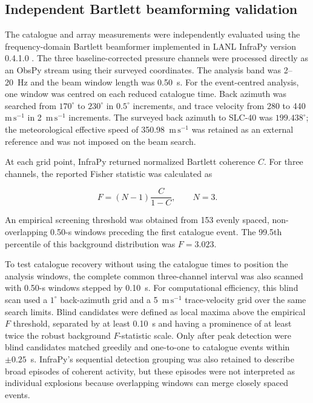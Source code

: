 \subsection{Independent Bartlett beamforming validation}
\label{sec:methods_infrapy_validation}

The catalogue and array measurements were independently evaluated using the
frequency-domain Bartlett beamformer implemented in LANL InfraPy version
0.4.1.0 \citep{infrapy}.  The three baseline-corrected pressure channels were
processed directly as an ObsPy stream using their surveyed coordinates.  The
analysis band was 2--20~Hz and the beam window length was 0.50~s.  For the
event-centred analysis, one window was centred on each reduced catalogue time.
Back azimuth was searched from \(170^{\circ}\) to \(230^{\circ}\) in
\(0.5^{\circ}\) increments, and trace velocity from 280 to
440~\(\mathrm{m\,s^{-1}}\) in 2~\(\mathrm{m\,s^{-1}}\) increments.  The
surveyed back azimuth to SLC-40 was \(199.438^{\circ}\); the meteorological
effective speed of 350.98~\(\mathrm{m\,s^{-1}}\) was retained as an external
reference and was not imposed on the beam search.

At each grid point, InfraPy returned normalized Bartlett coherence \(C\).  For
three channels, the reported Fisher statistic was calculated as

\begin{equation}
F = (N-1)\frac{C}{1-C}, \qquad N=3.
\label{eq:bartlett_f_statistic}
\end{equation}

An empirical screening threshold was obtained from 153 evenly spaced,
non-overlapping 0.50-s windows preceding the first catalogue event.  The
99.5th percentile of this background distribution was \(F=3.023\).

To test catalogue recovery without using the catalogue times to position the
analysis windows, the complete common three-channel interval was also scanned
with 0.50-s windows stepped by 0.10~s.  For computational efficiency, this
blind scan used a \(1^{\circ}\) back-azimuth grid and a
5~\(\mathrm{m\,s^{-1}}\) trace-velocity grid over the same search limits.
Blind candidates were defined as local maxima above the empirical \(F\)
threshold, separated by at least 0.10~s and having a prominence of at least
twice the robust background \(F\)-statistic scale.  Only after peak detection
were blind candidates matched greedily and one-to-one to catalogue events
within \(\pm0.25\)~s.  InfraPy's sequential detection grouping was also
retained to describe broad episodes of coherent activity, but these episodes
were not interpreted as individual explosions because overlapping windows can
merge closely spaced events.

